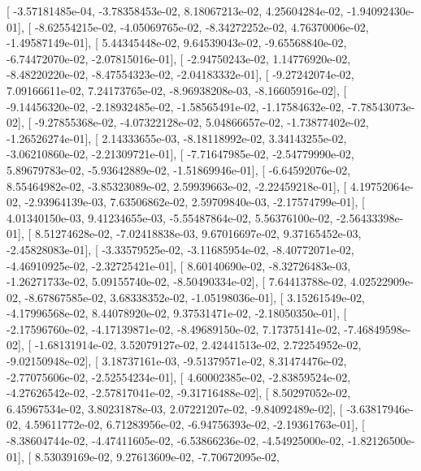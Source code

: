 \documentclass{article}
\begin{document}
       [ -3.57181485e-04,  -3.78358453e-02,   8.18067213e-02,
          4.25604284e-02,  -1.94092430e-01],
       [ -8.62554215e-02,  -4.05069765e-02,  -8.34272252e-02,
          4.76370006e-02,  -1.49587149e-01],
       [  5.44345448e-02,   9.64539043e-02,  -9.65568840e-02,
         -6.74472070e-02,  -2.07815016e-01],
       [ -2.94750243e-02,   1.14776920e-02,  -8.48220220e-02,
         -8.47554323e-02,  -2.04183332e-01],
       [ -9.27242074e-02,   7.09166611e-02,   7.24173765e-02,
         -8.96938208e-03,  -8.16605916e-02],
       [ -9.14456320e-02,  -2.18932485e-02,  -1.58565491e-02,
         -1.17584632e-02,  -7.78543073e-02],
       [ -9.27855368e-02,  -4.07322128e-02,   5.04866657e-02,
         -1.73877402e-02,  -1.26526274e-01],
       [  2.14333655e-03,  -8.18118992e-02,   3.34143255e-02,
         -3.06210860e-02,  -2.21309721e-01],
       [ -7.71647985e-02,  -2.54779990e-02,   5.89679783e-02,
         -5.93642889e-02,  -1.51869946e-01],
       [ -6.64592076e-02,   8.55464982e-02,  -3.85323089e-02,
          2.59939663e-02,  -2.22459218e-01],
       [  4.19752064e-02,  -2.93964139e-03,   7.63506862e-02,
          2.59709840e-03,  -2.17574799e-01],
       [  4.01340150e-03,   9.41234655e-03,  -5.55487864e-02,
          5.56376100e-02,  -2.56433398e-01],
       [  8.51274628e-02,  -7.02418838e-03,   9.67016697e-02,
          9.37165452e-03,  -2.45828083e-01],
       [ -3.33579525e-02,  -3.11685954e-02,  -8.40772071e-02,
         -4.46910925e-02,  -2.32725421e-01],
       [  8.60140690e-02,  -8.32726483e-03,  -1.26271733e-02,
          5.09155740e-02,  -8.50490334e-02],
       [  7.64413788e-02,   4.02522909e-02,  -8.67867585e-02,
          3.68338352e-02,  -1.05198036e-01],
       [  3.15261549e-02,  -4.17996568e-02,   8.44078920e-02,
          9.37531471e-02,  -2.18050350e-01],
       [ -2.17596760e-02,  -4.17139871e-02,  -8.49689150e-02,
          7.17375141e-02,  -7.46849598e-02],
       [ -1.68131914e-02,   3.52079127e-02,   2.42441513e-02,
          2.72254952e-02,  -9.02150948e-02],
       [  3.18737161e-03,  -9.51379571e-02,   8.31474476e-02,
         -2.77075606e-02,  -2.52554234e-01],
       [  4.60002385e-02,  -2.83859524e-02,  -4.27626542e-02,
         -2.57817041e-02,  -9.31716488e-02],
       [  8.50297052e-02,   6.45967534e-02,   3.80231878e-03,
          2.07221207e-02,  -9.84092489e-02],
       [ -3.63817946e-02,   4.59611772e-02,   6.71283956e-02,
         -6.94756393e-02,  -2.19361763e-01],
       [ -8.38604744e-02,  -4.47411605e-02,  -6.53866236e-02,
         -4.54925000e-02,  -1.82126500e-01],
       [  8.53039169e-02,   9.27613609e-02,  -7.70672095e-02,
\end{document}
